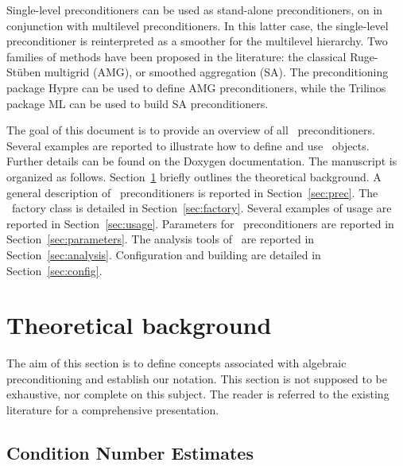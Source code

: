 \begin{remark}
Single-level preconditioners can be used as stand-alone preconditioners, on in
conjunction with multilevel preconditioners. In this latter case, the
single-level preconditioner is reinterpreted as a smoother for the multilevel
hierarchy. Two families of methods have been
proposed in the literature:
the classical Ruge-St\"uben multigrid (AMG), or smoothed aggregation (SA).
The preconditioning package Hypre can be used to define AMG preconditioners,
  while the Trilinos package ML can be used to build SA preconditioners.
\end{remark}

\smallskip

The goal of this document is to provide an overview of all \ifpack\
  preconditioners. Several examples are reported to illustrate how to define
  and use \ifpack\ objects. Further details can be found on the Doxygen
  documentation.
The manuscript is organized as follows. Section~\ref{sec:theo} briefly outlines
the theoretical background. A general description of \ifpack\
  preconditioners is reported in Section~\ref{sec:prec}.
The \ifpack\ factory class is detailed in
Section~\ref{sec:factory}. Several examples of usage are reported in
Section~\ref{sec:usage}. Parameters for \ifpack~preconditioners are reported in
Section~\ref{sec:parameters}. The analysis tools of \ifpack\ are reported in
Section~\ref{sec:analysis}. Configuration and building are detailed in
Section~\ref{sec:config}.

\section{Theoretical background}
\label{sec:theo}

The aim of this section is to define concepts associated with algebraic
preconditioning and establish our notation. This section is not
supposed to be exhaustive, nor complete on this subject. The reader is
referred to the existing literature for a comprehensive presentation.

\medskip

\subsection{Condition Number Estimates}
\label{sec:cond}

